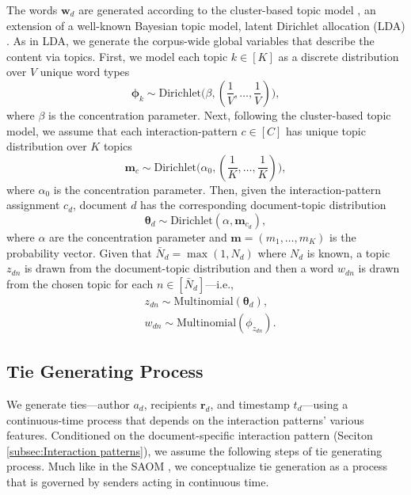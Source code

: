 \documentclass{article}
\begin{document}
The words $\boldsymbol{w}_d$ are generated according to the cluster-based topic model \cite{wallach2008structured}, an extension of a well-known Bayesian topic model, latent Dirichlet allocation (LDA) \cite{Blei2003}. As in LDA, we generate the corpus-wide global variables that describe the content via topics. First, we model each topic $k\in [K]$ as a discrete distribution over $V$ unique word types 
\begin{equation}
\boldsymbol{\phi}_k \sim \mbox{Dirichlet}\Big(\beta, (\frac{1}{V},\ldots,\frac{1}{V})\Big),
\end{equation}
where $\beta$ is the concentration parameter. Next, following the cluster-based topic model, we assume that each interaction-pattern $c \in [C]$ has unique topic distribution over $K$ topics 
	\begin{equation}
\boldsymbol{m}_c\sim \mbox{Dirichlet}\Big(\alpha_0, (\frac{1}{K},\ldots,\frac{1}{K})\Big),
	\end{equation}
	where $\alpha_0$ is the concentration parameter. Then, given the interaction-pattern assignment $c_d$, document $d$ has the corresponding document-topic distribution
		\begin{equation}
	\boldsymbol{\theta}_d \sim \mbox{Dirichlet}(\alpha, \boldsymbol{m}_{c_d}),
	\end{equation}
where $\alpha$ are the concentration parameter and $\boldsymbol{m}=(m_1,\ldots,m_K)$ is the probability vector. Given that $\bar N_d = \max(1, N_d)$ where $N_d$ is known, a topic $z_{dn}$ is drawn from the document-topic distribution and then a word $w_{dn}$ is drawn from the chosen topic for each $n \in [\bar N_d]$---i.e.,
\begin{equation}
\begin{aligned}
&z_{dn} \sim \mbox{Multinomial}(\boldsymbol{\theta}_d),\\
&w_{dn} \sim\mbox{Multinomial} (\phi_{z_{dn}}).
\end{aligned}
\end{equation}


\subsection{Tie Generating Process}\label{subsec:Tie generating process}
We generate ties---author $a_d$, recipients $\boldsymbol{r}_d$, and timestamp $t_d$---using a continuous-time process
that depends on the interaction patterns' various features. Conditioned on the document-specific interaction pattern (Seciton \ref{subsec:Interaction patterns}), we assume the following steps of tie generating process. Much like in the SAOM \cite{snijders2010introduction}, we conceptualize tie generation as a process that is governed by senders acting in continuous time. 
\end{document}
